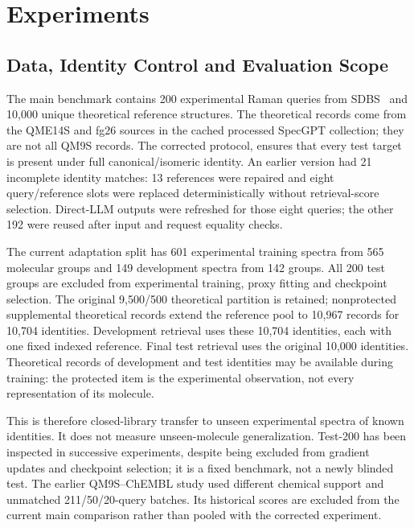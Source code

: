 \section{Experiments}\label{sec:latest_experiments}
\subsection{Data, Identity Control and Evaluation Scope}\label{sec:protocol}
The main benchmark contains 200 experimental Raman queries from SDBS~\cite{sdbsAIST} and 10,000 unique theoretical reference structures. The theoretical records come from the QME14S and fg26 sources in the cached processed SpecGPT collection; they are not all QM9S records. The corrected protocol, ensures that every test target is present under full canonical/isomeric identity. An earlier version had 21 incomplete identity matches: 13 references were repaired and eight query/reference slots were replaced deterministically without retrieval-score selection. Direct-LLM outputs were refreshed for those eight queries; the other 192 were reused after input and request equality checks.

The current adaptation split has 601 experimental training spectra from 565 molecular groups and 149 development spectra from 142 groups. All 200 test groups are excluded from experimental training, proxy fitting and checkpoint selection. The original 9,500/500 theoretical partition is retained; nonprotected supplemental theoretical records extend the reference pool to 10,967 records for 10,704 identities. Development retrieval uses these 10,704 identities, each with one fixed indexed reference. Final test retrieval uses the original 10,000 identities. Theoretical records of development and test identities may be available during training: the protected item is the experimental observation, not every representation of its molecule.

This is therefore closed-library transfer to unseen experimental spectra of known identities. It does not measure unseen-molecule generalization. Test-200 has been inspected in successive experiments, despite being excluded from gradient updates and checkpoint selection; it is a fixed benchmark, not a newly blinded test. The earlier QM9S--ChEMBL study used different chemical support and unmatched 211/50/20-query batches. Its historical scores are excluded from the current main comparison rather than pooled with the corrected experiment.

